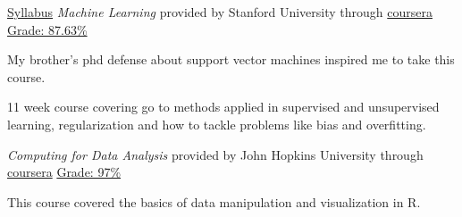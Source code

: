 

\begin{cventries}

\cventry
  {\href{https://www.coursera.org/learn/machine-learning\#syllabus}{Syllabus}} %
  {\textit{Machine Learning} provided by Stanford University through \href{https://www.coursera.org/learn/machine-learning}{coursera}}
  {\href{https://www.coursera.org/api/legacyCertificates.v1/spark/statementOfAccomplishment/971489~4383751/pdf}{Grade: 87.63\%}} %
  {} %
  {
    \begin{cvitems} %
      \item {My brother's phd defense about support vector machines inspired me to take this course.}
      \item {11 week course covering go to methods applied in supervised and unsupervised learning, regularization and how to tackle problems like bias and overfitting.}
    \end{cvitems}
  }

\cventry
  {} %
  {\textit{Computing for Data Analysis} provided by John Hopkins University through \href{https://www.coursera.org}{coursera}} %
  {\href{https://www.coursera.org/api/legacyCertificates.v1/spark/statementOfAccomplishment/970940~4383751/pdf}{Grade: 97\%}} %
  {} %
  {
    \begin{cvitems} %
      \item {This course covered the basics of data manipulation and visualization in R.}
    \end{cvitems}
  }


\end{cventries}
